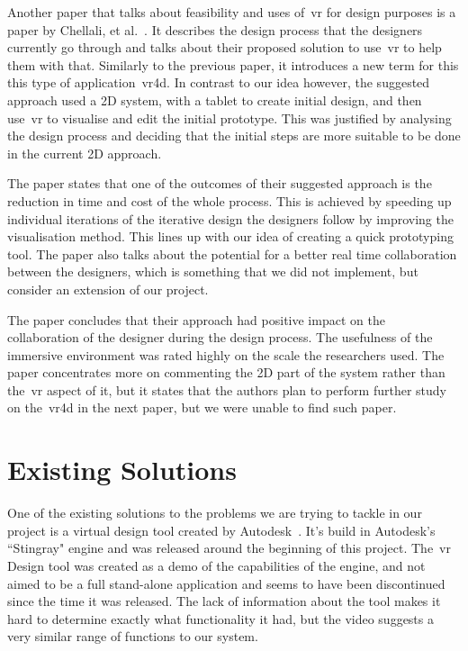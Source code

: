     Another paper that talks about feasibility and uses of~\acrshort{vr} for design purposes is a paper by Chellali, et al.~\cite{chellali2013}. It describes the design process that the designers currently go through and talks about their proposed solution to use~\acrshort{vr} to help them with that. Similarly to the previous paper, it introduces a new term for this this type of application~\acrfull{vr4d}. In contrast to our idea however, the suggested approach used a 2D system, with a tablet to create initial design, and then use~\acrshort{vr} to visualise and edit the initial prototype. This was justified by analysing the design process and deciding that the initial steps are more suitable to be done in the current 2D approach. 
    
    The paper states that one of the outcomes of their suggested approach is the reduction in time and cost of the whole process. This is achieved by speeding up individual iterations of the iterative design the designers follow by improving the visualisation method. This lines up with our idea of creating a quick prototyping tool. The paper also talks about the potential for a better real time collaboration between the designers, which is something that we did not implement, but consider an extension of our project.
    
    
    The paper concludes that their approach had positive impact on the collaboration of the designer during the design process. The usefulness of the immersive environment was rated highly on the scale the researchers used. The paper concentrates more on commenting the 2D part of the system rather than the~\acrshort{vr} aspect of it, but it states that the authors plan to perform further study on the~\acrshort{vr4d} in the next paper, but we were unable to find such paper.
    
    
\section{Existing Solutions}
\label{sec:existing_solutions}


    One of the existing solutions to the problems we are trying to tackle in our project is a virtual design tool created by Autodesk~\cite{autodesk_interns_youtube}. It's build in Autodesk's ``Stingray" engine and was released around the beginning of this project. The~\acrshort{vr} Design tool was created as a demo of the capabilities of the engine, and not aimed to be a full stand-alone application and seems to have been discontinued since the time it was released. The lack of information about the tool makes it hard to determine exactly what functionality it had, but the video suggests a very similar range of functions to our system.
    
